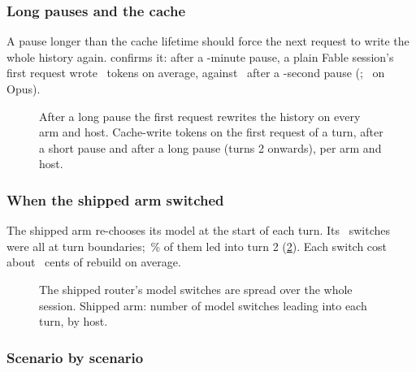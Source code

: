 \subsubsection{Long pauses and the cache}

A pause longer than the cache lifetime should force the next request to write the whole history again.
 confirms it: after a \LongGapMin-minute pause, a plain Fable session's first request wrote
\GapWriteFableLong\ tokens on average, against \GapWriteFableShort\ after a \ShortGapS-second pause
(\GapWriteFableX\X; \GapWriteOpusX\X\ on Opus).

\begin{figure}[tbp]
\centering
{}\par\smallskip

\caption{After a long pause the first request rewrites the history on every arm and host. Cache-write tokens on the first request of a turn, after a short pause and after a long pause (turns 2
onwards), per arm and host.}
\label{vt:fig:gapwrites}
\end{figure}

\subsubsection{When the shipped arm switched}

The shipped arm re-chooses its model at the start of each turn. Its \SwitchTotal\ switches were all at turn
boundaries; \SwitchTurnTwoPct\,\% of them led into turn 2 (\cref{vt:fig:switch}). Each switch cost about
\RebuildPerSwitchCents\ cents of rebuild on average.

\begin{figure}[tbp]
\centering
{}\par\smallskip

\caption{The shipped router's model switches are spread over the whole session. Shipped arm: number of model switches leading into each turn, by host.}
\label{vt:fig:switch}
\end{figure}


\subsubsection{Scenario by scenario}

